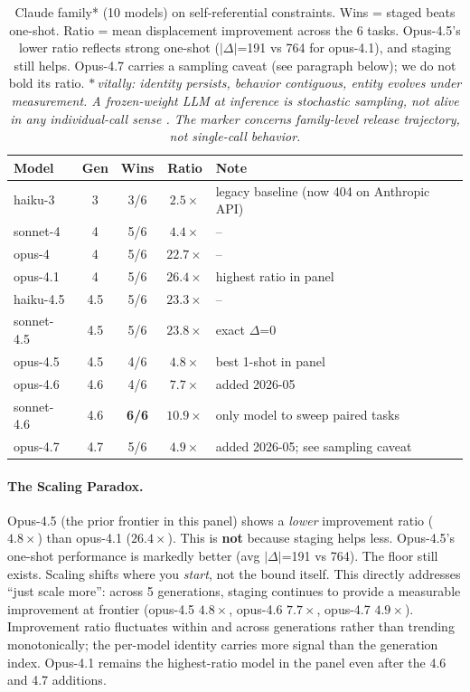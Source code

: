 \documentclass{article}
\theoremstyle{plain}
\theoremstyle{definition}
\theoremstyle{remark}
\begin{document}
\begin{table}[t]
\centering
\small
\caption{Claude family* (10 models) on self-referential constraints. Wins = staged beats one-shot. Ratio = mean displacement improvement across the 6 tasks. Opus-4.5's lower ratio reflects strong one-shot ($|\Delta|$=191 vs 764 for opus-4.1), and staging still helps. Opus-4.7 carries a sampling caveat (see paragraph below); we do not bold its ratio. \emph{$*$\,vitally: identity persists, behavior contiguous, entity evolves under measurement. A frozen-weight LLM at inference is stochastic sampling, not alive in any individual-call sense \citep{unherd2026aievolution}. The marker concerns family-level release trajectory, not single-call behavior.}}
\label{tab:claude_family}
\begin{tabular}{lcccl}
\toprule
Model & Gen & Wins & Ratio & Note \\
\midrule
haiku-3 & 3 & 3/6 & $2.5\times$ & legacy baseline (now 404 on Anthropic API) \\
sonnet-4 & 4 & 5/6 & $4.4\times$ & -- \\
opus-4 & 4 & 5/6 & $22.7\times$ & -- \\
opus-4.1 & 4 & 5/6 & $\mathbf{26.4\times}$ & highest ratio in panel \\
haiku-4.5 & 4.5 & 5/6 & $23.3\times$ & -- \\
sonnet-4.5 & 4.5 & 5/6 & $23.8\times$ & exact $\Delta$=0 \\
opus-4.5 & 4.5 & 4/6 & $4.8\times$ & best 1-shot in panel \\
opus-4.6 & 4.6 & 4/6 & $7.7\times$ & added 2026-05 \\
sonnet-4.6 & 4.6 & \textbf{6/6} & $10.9\times$ & only model to sweep paired tasks \\
opus-4.7 & 4.7 & 5/6 & $4.9\times$ & added 2026-05; see sampling caveat \\
\bottomrule
\end{tabular}
\end{table}

\paragraph{The Scaling Paradox.}
Opus-4.5 (the prior frontier in this panel) shows a \emph{lower} improvement ratio ($4.8\times$) than opus-4.1 ($26.4\times$). This is \textbf{not} because staging helps less. Opus-4.5's one-shot performance is markedly better (avg $|\Delta|$=191 vs 764). The floor still exists. Scaling shifts where you \emph{start}, not the bound itself. This directly addresses ``just scale more'': across 5 generations, staging continues to provide a measurable improvement at frontier (opus-4.5 $4.8\times$, opus-4.6 $7.7\times$, opus-4.7 $4.9\times$). Improvement ratio fluctuates within and across generations rather than trending monotonically; the per-model identity carries more signal than the generation index. Opus-4.1 remains the highest-ratio model in the panel even after the 4.6 and 4.7 additions.
\end{document}
